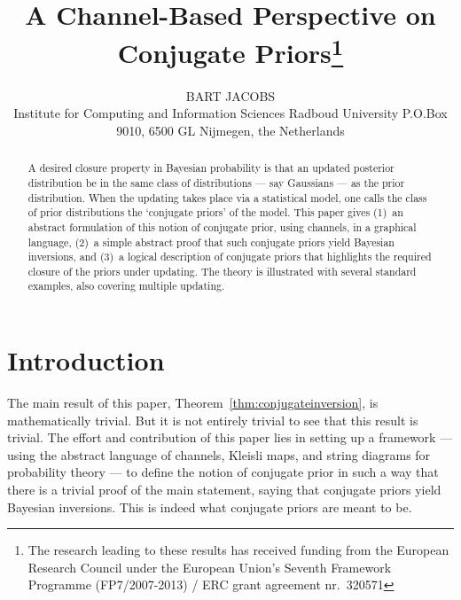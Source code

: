 \documentclass{mscs}
\title[A Channel-Based Perspective on Conjugate Priors]{A
  Channel-Based Perspective on Conjugate Priors\thanks{The research
    leading to these results has received funding from the European
    Research Council under the European Union's Seventh Framework
    Programme (FP7/2007-2013) / ERC grant agreement nr.~320571}}
\author[B. Jacobs]{%
  B\ls A\ls R\ls T\ns
  J\ls A\ls C\ls O\ls B\ls S\\
  Institute for Computing and Information Sciences
  Radboud University\addressbreak
  P.O.Box 9010, 6500 GL Nijmegen, the Netherlands}
\begin{document}
\maketitle

\begin{abstract} 
A desired closure property in Bayesian probability is that an updated
posterior distribution be in the same class of distributions --- say
Gaussians --- as the prior distribution. When the updating takes place
via a statistical model, one calls the class of prior distributions
the `conjugate priors' of the model.  This paper gives (1)~an abstract
formulation of this notion of conjugate prior, using channels, in a
graphical language, (2)~a simple abstract proof that such conjugate
priors yield Bayesian inversions, and (3)~a logical description of
conjugate priors that highlights the required closure of the priors
under updating. The theory is illustrated with several standard
examples, also covering multiple updating.
\end{abstract}


\section{Introduction}\label{sec:intro}

The main result of this paper, Theorem~\ref{thm:conjugateinversion},
is mathematically trivial. But it is not entirely trivial to see that
this result is trivial. The effort and contribution of this paper lies
in setting up a framework --- using the abstract language of channels,
Kleisli maps, and string diagrams for probability theory --- to define
the notion of conjugate prior in such a way that there is a trivial
proof of the main statement, saying that conjugate priors yield
Bayesian inversions. This is indeed what conjugate priors are meant to
be.


\end{document}
